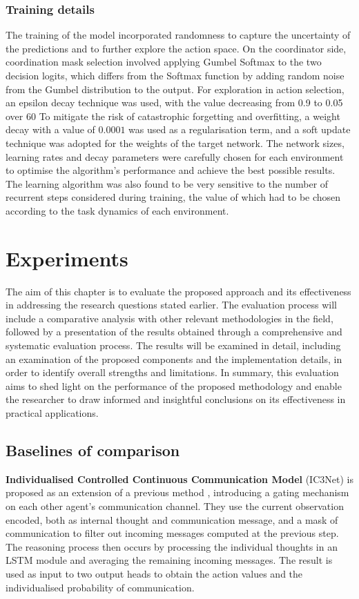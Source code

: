 \documentclass[a4paper,singleside,12pt]{report} %
\begin{document}
\subsection{Training details}\label{training-details}
The training of the model incorporated randomness to capture the uncertainty of the predictions and to further explore the action space. On the coordinator side, coordination mask selection involved applying Gumbel Softmax to the two decision logits, which differs from the Softmax function by adding random noise from the Gumbel distribution to the output. For exploration in action selection, an epsilon decay technique was used, with the value decreasing from 0.9 to 0.05 over 60%
To mitigate the risk of catastrophic forgetting and overfitting, a weight decay with a value of $0.0001$ was used as a regularisation term, and a soft update technique was adopted for the weights of the target network. The network sizes, learning rates and decay parameters were carefully chosen for each environment to optimise the algorithm's performance and achieve the best possible results. The learning algorithm was also found to be very sensitive to the number of recurrent steps considered during training, the value of which had to be chosen according to the task dynamics of each environment.

\chapter{Experiments}\label{Evaluation}
The aim of this chapter is to evaluate the proposed approach and its effectiveness in addressing the research questions stated earlier. The evaluation process will include a comparative analysis with other relevant methodologies in the field, followed by a presentation of the results obtained through a comprehensive and systematic evaluation process. The results will be examined in detail, including an examination of the proposed components and the implementation details, in order to identify overall strengths and limitations. In summary, this evaluation aims to shed light on the performance of the proposed methodology and enable the researcher to draw informed and insightful conclusions on its effectiveness in practical applications.

\section{Baselines of comparison}\label{Baselines}
\textbf{Individualised Controlled Continuous Communication Model} (IC3Net)\cite{Singh2018LearningWT} is proposed as an extension of a previous method \cite{Sukhbaatar2016LearningMC}, introducing a gating mechanism on each other agent's communication channel. They use the current observation encoded, both as internal thought and communication message, and a mask of communication to filter out incoming messages computed at the previous step. The reasoning process then occurs by processing the individual thoughts in an LSTM module and averaging the remaining incoming messages. The result is used as input to two output heads to obtain the action values and the individualised probability of communication.
\end{document}
